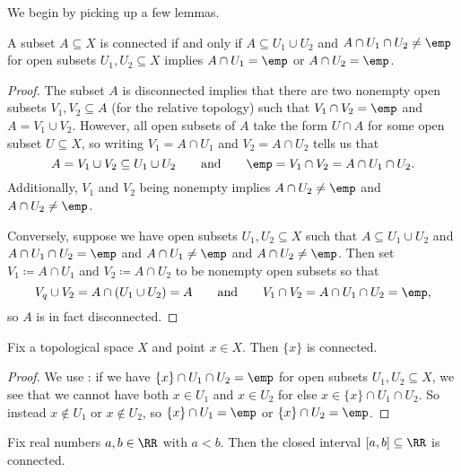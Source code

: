 \documentclass[../notes.tex]{subfiles}
\begin{document}
We begin by picking up a few lemmas.
\begin{lemma} \label{lem:betterconnected}
	A subset $A\subseteq X$ is connected if and only if $A\subseteq U_1\cup U_2$ and $A\cap U_1\cap U_2\ne\emp$ for open subsets $U_1,U_2\subseteq X$ implies $A\cap U_1=\emp$ or $A\cap U_2=\emp$.
\end{lemma}
\begin{proof}
	The subset $A$ is disconnected implies that there are two nonempty open subsets $V_1,V_2\subseteq A$ (for the relative topology) such that $V_1\cap V_2=\emp$ and $A=V_1\cup V_2$. However, all open subsets of $A$ take the form $U\cap A$ for some open subset $U\subseteq X$, so writing $V_1=A\cap U_1$ and $V_2=A\cap U_2$ tells us that
	\[A=V_1\cup V_2\subseteq U_1\cup U_2\qquad\text{and}\qquad\emp=V_1\cap V_2=A\cap U_1\cap U_2.\]
	Additionally, $V_1$ and $V_2$ being nonempty implies $A\cap U_2\ne\emp$ and $A\cap U_2\ne\emp$.

	Conversely, suppose we have open subsets $U_1,U_2\subseteq X$ such that $A\subseteq U_1\cup U_2$ and $A\cap U_1\cap U_2=\emp$ and $A\cap U_1\ne\emp$ and $A\cap U_2\ne\emp$. Then set $V_1\coloneqq A\cap U_1$ and $V_2\coloneqq A\cap U_2$ to be nonempty open subsets so that
	\[V_q\cup V_2=A\cap(U_1\cup U_2)=A\qquad\text{and}\qquad V_1\cap V_2=A\cap U_1\cap U_2=\emp,\]
	so $A$ is in fact disconnected.
\end{proof}
\begin{lemma} \label{lem:singletonconn}
	Fix a topological space $X$ and point $x\in X$. Then $\{x\}$ is connected.
\end{lemma}
\begin{proof}
	We use : if we have $\{x\}\cap U_1\cap U_2=\emp$ for open subsets $U_1,U_2\subseteq X$, we see that we cannot have both $x\in U_1$ and $x\in U_2$ for else $x\in\{x\}\cap U_1\cap U_2$. So instead $x\notin U_1$ or $x\notin U_2$, so $\{x\}\cap U_1=\emp$ or $\{x\}\cap U_2=\emp$.
\end{proof}
\begin{lemma} \label{lem:intervalconn}
	Fix real numbers $a,b\in\RR$ with $a<b$. Then the closed interval $[a,b]\subseteq\RR$ is connected.
\end{lemma}
\end{document}
